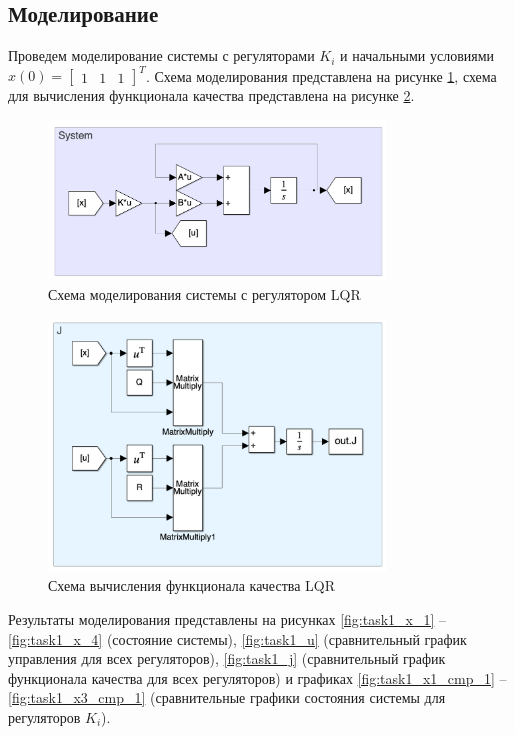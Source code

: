 \subsection{Моделирование}
Проведем моделирование системы с регуляторами $K_i$ и начальными условиями $x(0) = \begin{bmatrix} 1 & 1 & 1 \end{bmatrix}^T$. 
Схема моделирования представлена на рисунке \ref{fig:scheme_lqr}, схема для вычисления функционала качества представлена на рисунке \ref{fig:scheme_lqr_j}.
\begin{figure}[ht!]
    \centering
    \includegraphics[width=0.8\textwidth]{media/task1_system_scheme.png}
    \caption{Схема моделирования системы с регулятором LQR}
    \label{fig:scheme_lqr}
\end{figure}
\begin{figure}[ht!]
    \centering
    \includegraphics[width=0.8\textwidth]{media/task1_J_scheme.png}
    \caption{Схема вычисления функционала качества LQR}
    \label{fig:scheme_lqr_j}
\end{figure}

Результаты моделирования представлены на рисунках \ref{fig:task1_x_1} -- \ref{fig:task1_x_4} (состояние системы),
\ref{fig:task1_u} (сравнительный график управления для всех регуляторов), \ref{fig:task1_j} (сравнительный график функционала качества для всех регуляторов) и 
графиках \ref{fig:task1_x1_cmp_1} -- \ref{fig:task1_x3_cmp_1} (сравнительные графики состояния системы для регуляторов $K_i$).

